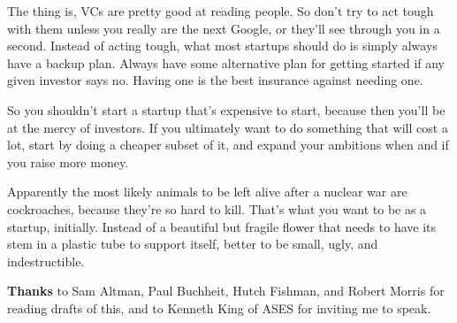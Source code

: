 The thing is, VCs are pretty good at reading people. So don't try to act
tough with them unless you really are the next Google, or they'll see
through you in a second. Instead of acting tough, what most startups
should do is simply always have a backup plan. Always have some
alternative plan for getting started if any given investor says no.
Having one is the best insurance against needing one.

So you shouldn't start a startup that's expensive to start, because then
you'll be at the mercy of investors. If you ultimately want to do
something that will cost a lot, start by doing a cheaper subset of it,
and expand your ambitions when and if you raise more money.

Apparently the most likely animals to be left alive after a nuclear war
are cockroaches, because they're so hard to kill. That's what you want
to be as a startup, initially. Instead of a beautiful but fragile flower
that needs to have its stem in a plastic tube to support itself, better
to be small, ugly, and indestructible.


\textbf{Thanks} to Sam Altman, Paul Buchheit, Hutch Fishman, and Robert
Morris for reading drafts of this, and to Kenneth King of ASES for
inviting me to speak.
